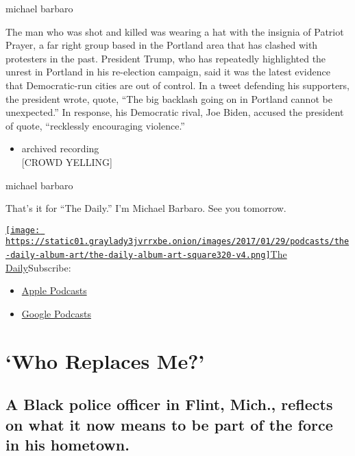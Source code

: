 michael barbaro

The man who was shot and killed was wearing a hat with the insignia of
Patriot Prayer, a far right group based in the Portland area that has
clashed with protesters in the past. President Trump, who has repeatedly
highlighted the unrest in Portland in his re-election campaign, said it
was the latest evidence that Democratic-run cities are out of control.
In a tweet defending his supporters, the president wrote, quote, ``The
big backlash going on in Portland cannot be unexpected.'' In response,
his Democratic rival, Joe Biden, accused the president of quote,
``recklessly encouraging violence.''

\begin{itemize}
\tightlist
\item
  archived recording\\
  {[}CROWD YELLING{]}
\end{itemize}

michael barbaro

That's it for ``The Daily.'' I'm Michael Barbaro. See you tomorrow.

\href{https://www.nytimes3xbfgragh.onion/column/the-daily}{\texttt{[image: https://static01.graylady3jvrrxbe.onion/images/2017/01/29/podcasts/the-daily-album-art/the-daily-album-art-square320-v4.png]}The
Daily}Subscribe:

\begin{itemize}
\tightlist
\item
  \href{https://itunes.apple.com/us/podcast/id1200361736}{Apple
  Podcasts}
\item
  \href{https://www.google.com/podcasts?feed=aHR0cHM6Ly9yc3MuYXJ0MTkuY29tL3RoZS1kYWlseQ\%3D\%3D}{Google
  Podcasts}
\end{itemize}

\hypertarget{who-replaces-me-1}{%
\section{`Who Replaces Me?'}\label{who-replaces-me-1}}

\hypertarget{a-black-police-officer-in-flint-mich-reflects-on-what-it-now-means-to-be-part-of-the-force-in-his-hometown-1}{%
\subsection{A Black police officer in Flint, Mich., reflects on what it
now means to be part of the force in his
hometown.}\label{a-black-police-officer-in-flint-mich-reflects-on-what-it-now-means-to-be-part-of-the-force-in-his-hometown-1}}

